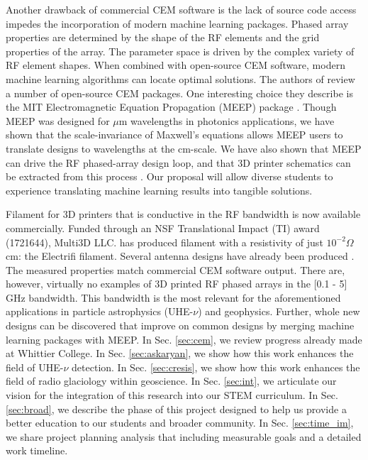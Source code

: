 \documentclass[11pt]{amsart}
\begin{document}
Another drawback of commercial CEM software is the lack of source code access impedes the incorporation of modern machine learning packages.  Phased array properties are determined by the shape of the RF elements and the grid properties of the array.  The parameter space is driven by the complex variety of RF element shapes.  When combined with open-source CEM software, modern machine learning algorithms can locate optimal solutions.  The authors of \cite{10.3390/electronics8121506} review a number of open-source CEM packages.  One interesting choice they describe is the MIT Electromagnetic Equation Propagation (MEEP) package \cite{10.1016/j.cpc.2009.11.008}.  Though MEEP was designed for $\mu$m wavelengths in photonics applications, we have shown that the scale-invariance of Maxwell's equations allows MEEP users to translate designs to wavelengths at the cm-scale.  We have also shown that MEEP can drive the RF phased-array design loop, and that 3D printer schematics can be extracted from this process \cite{electronics10040415,meepcon2022,10.1016/j.cpc.2009.11.008}.  Our proposal will allow diverse students to experience translating machine learning results into tangible solutions.  

Filament for 3D printers that is conductive in the RF bandwidth is now available commercially.  Funded through an NSF Translational Impact (TI) award (1721644), Multi3D LLC. has produced filament with a resistivity of just $10^{-2} \Omega$ cm: the Electrifi filament.  Several antenna designs have already been produced \cite{8786183,10.1049/iet-map.2017.0104}.  The measured properties match commercial CEM software output.  There are, however, virtually no examples of 3D printed RF phased arrays in the [0.1 - 5] GHz bandwidth.  This bandwidth is the most relevant for the aforementioned applications in particle astrophysics (UHE-$\nu$) and geophysics.  Further, whole new designs can be discovered that improve on common designs by merging machine learning packages with MEEP.  In Sec. \ref{sec:cem}, we review progress already made at Whittier College.  In Sec. \ref{sec:askaryan}, we show how this work enhances the field of UHE-$\nu$ detection.  In Sec. \ref{sec:cresis}, we show how this work enhances the field of radio glaciology within geoscience.  In Sec. \ref{sec:int}, we articulate our vision for the integration of this research into our STEM curriculum.  In Sec. \ref{sec:broad}, we describe the phase of this project designed to help us provide a better education to our students and broader community.  In Sec. \ref{sec:time_im}, we share project planning analysis that including measurable goals and a detailed work timeline.
\end{document}
